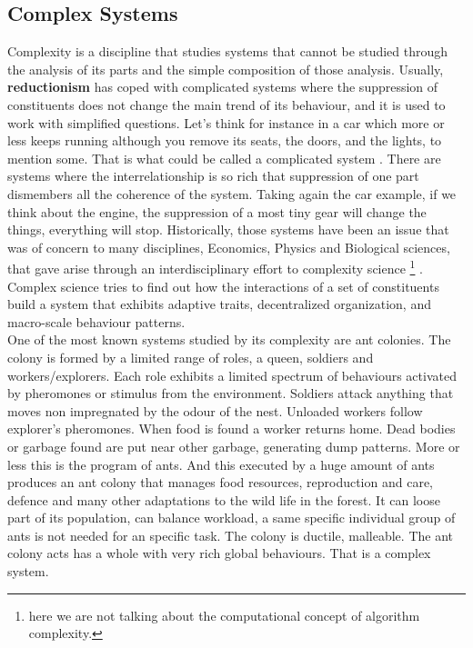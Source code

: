 \documentclass[11pt,oneside,a4paper,openright]{report}
\begin{document}
\subsection{Complex Systems}

Complexity is a discipline that studies systems that cannot be studied through the analysis of its
parts and the simple composition of those analysis. Usually, \textbf{reductionism} has coped with complicated systems
where the suppression of constituents does not change the main trend of its behaviour, and it is used to
work with simplified questions. Let's think for instance in a car which more or less keeps running although 
you remove its seats, the doors, and the lights, to mention some. That is what could be called a complicated 
system \cite{MillerPage2007}.
There are systems where the interrelationship is so rich that suppression of one part dismembers all the coherence
of the system. Taking again the car example, if we think about the engine, the suppression of a most tiny
gear will change the things, everything will stop. Historically, those systems have been an issue that was 
of concern to many disciplines, Economics, Physics and Biological sciences, that gave arise through an
interdisciplinary effort to complexity science \footnote{here we are not talking about the computational
concept of algorithm complexity.}  \cite{MelanieMitchell2009}. 
Complex science tries to find out how the interactions of a set of constituents build a system that exhibits 
adaptive traits, decentralized organization, and macro-scale behaviour patterns.\\

One of the most known systems studied by its complexity are ant colonies. The colony is formed by a limited range
of roles, a queen, soldiers and workers/explorers. Each role exhibits a limited spectrum of behaviours activated by pheromones or stimulus from the environment. Soldiers attack anything that moves non impregnated by the odour of the nest. Unloaded workers follow explorer's pheromones. When food is found a worker returns home. Dead bodies or garbage found are put near other garbage, generating dump patterns. More or less this is the program of ants. And this executed by a huge amount of ants produces an ant colony that manages food resources, reproduction and care, defence and many
other adaptations to the wild life in the forest. It can loose part of its population, can balance workload, a same specific individual group of ants is not needed for an specific task. The colony is ductile, malleable. The ant 
colony acts has a whole with very rich global behaviours. That is a complex system.\\
\end{document}
